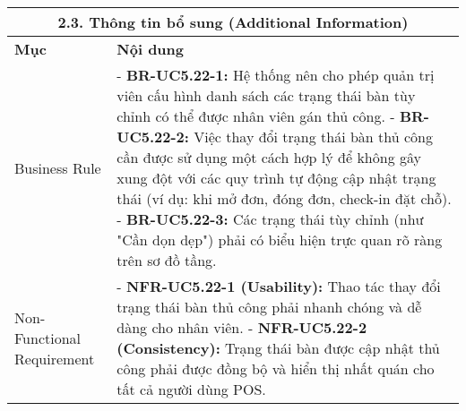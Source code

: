 \begin{longtable}{|m{4cm}|p{11cm}|}
\hline
\multicolumn{2}{|c|}{\textbf{2.3. Thông tin bổ sung (Additional Information)}} \\
\hline
\textbf{Mục} & \textbf{Nội dung} \\
\hline
Business Rule & - \textbf{BR-UC5.22-1:} Hệ thống nên cho phép quản trị viên cấu hình danh sách các trạng thái bàn tùy chỉnh có thể được nhân viên gán thủ công. \newline - \textbf{BR-UC5.22-2:} Việc thay đổi trạng thái bàn thủ công cần được sử dụng một cách hợp lý để không gây xung đột với các quy trình tự động cập nhật trạng thái (ví dụ: khi mở đơn, đóng đơn, check-in đặt chỗ). \newline - \textbf{BR-UC5.22-3:} Các trạng thái tùy chỉnh (như "Cần dọn dẹp") phải có biểu hiện trực quan rõ ràng trên sơ đồ tầng. \\
\hline
Non-Functional Requirement & - \textbf{NFR-UC5.22-1 (Usability):} Thao tác thay đổi trạng thái bàn thủ công phải nhanh chóng và dễ dàng cho nhân viên. \newline - \textbf{NFR-UC5.22-2 (Consistency):} Trạng thái bàn được cập nhật thủ công phải được đồng bộ và hiển thị nhất quán cho tất cả người dùng POS. \\
\hline
\end{longtable}
